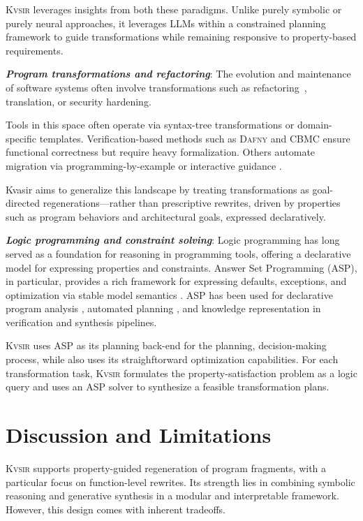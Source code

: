 \documentclass[noacm,sigplan,review]{acmart}
\newcommand{\sys}{{\scshape Kv{\textalpha}sir}\xspace}
\newcommand{\heading}[1]{\vspace{2pt}\noindent\textbf{\emph{#1}}:\enspace}
\begin{document}
\sys leverages insights from both these paradigms.
Unlike purely symbolic or purely neural approaches, it leverages LLMs within a
constrained planning framework to guide transformations while remaining
responsive to property-based requirements.

\heading{Program transformations and refactoring}
The evolution and maintenance of software systems often involve transformations
such as refactoring~\cite{Fowler99,Mens04,Myers16}, translation, or security hardening. %

Tools in this space often operate via syntax-tree transformations or
domain-specific templates. Verification-based methods such as \textsc{Dafny}
\cite{leino2016dafny} and \textsc{CBMC} \cite{Clarke04} ensure functional correctness
but require heavy formalization.
Others automate migration via
programming-by-example or interactive guidance \cite{gulwani2017program, le2017interactive}.


Kvasir aims to generalize this landscape by treating transformations as
goal-directed regenerations---rather than prescriptive rewrites, driven by
properties such as program behaviors and architectural goals, expressed declaratively.

\heading{Logic programming and constraint solving}
Logic programming has long served as a foundation for reasoning in programming
tools, offering a declarative model for expressing properties and constraints.
Answer Set Programming (ASP), in particular, provides a rich framework for
expressing defaults, exceptions, and optimization via stable model semantics
\cite{Gelfond_2000, Gelfond_2002, Eiter_2009}. 
ASP has been used for
declarative program analysis \cite{benton2007interactive}, automated planning
\cite{nguyen2020explainable, son2022answersetplanningsurvey}, and knowledge
representation in verification and synthesis pipelines.

\sys uses ASP as its planning back-end for the planning, decision-making
process, while also uses its straighftorward optimization capabilities.
For each transformation task, \sys formulates the property-satisfaction problem as a logic query and uses an ASP solver to
synthesize a feasible transformation plans.

\section{Discussion and Limitations}
\label{sec:discussion}

\sys supports property-guided regeneration of program fragments, with a particular focus on function-level rewrites. Its strength lies in combining symbolic reasoning and generative synthesis in a modular and interpretable framework. However, this design comes with inherent tradeoffs.
\end{document}
